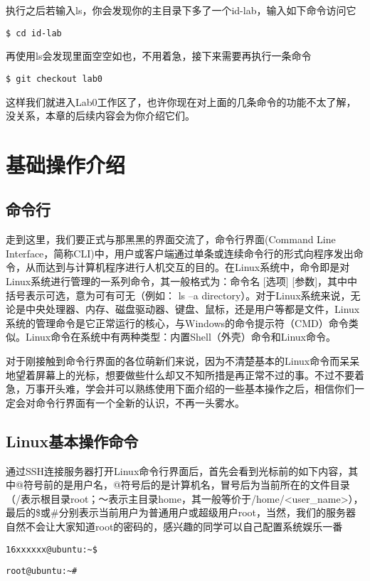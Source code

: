 执行之后若输入ls，你会发现你的主目录下多了一个id-lab，输入如下命令访问它
\begin{verbatim}
$ cd id-lab
\end{verbatim}
再使用ls会发现里面空空如也，不用着急，接下来需要再执行一条命令
\begin{verbatim}
$ git checkout lab0
\end{verbatim}
这样我们就进入Lab0工作区了，也许你现在对上面的几条命令的功能不太了解，没关系，本章的后续内容会为你介绍它们。

\section{基础操作介绍}
\subsection{命令行}
走到这里，我们要正式与那黑黑的界面交流了，命令行界面(Command Line Interface，简称CLI)中，用户或客户端通过单条或连续命令行的形式向程序发出命令，从而达到与计算机程序进行人机交互的目的。在Linux系统中，命令即是对Linux系统进行管理的一系列命令，其一般格式为：命令名 [选项] [参数]，其中中括号表示可选，意为可有可无（例如： ls –a directory）。对于Linux系统来说，无论是中央处理器、内存、磁盘驱动器、键盘、鼠标，还是用户等都是文件，Linux系统的管理命令是它正常运行的核心，与Windows的命令提示符（CMD）命令类似。Linux命令在系统中有两种类型：内置Shell（外壳）命令和Linux命令。

对于刚接触到命令行界面的各位萌新们来说，因为不清楚基本的Linux命令而呆呆地望着屏幕上的光标，想要做些什么却又不知所措是再正常不过的事。不过不要着急，万事开头难，学会并可以熟练使用下面介绍的一些基本操作之后，相信你们一定会对命令行界面有一个全新的认识，不再一头雾水。

\subsection{Linux基本操作命令}
通过SSH连接服务器打开Linux命令行界面后，首先会看到光标前的如下内容，其中@符号前的是用户名，@符号后的是计算机名，冒号后为当前所在的文件目录（/表示根目录root；～表示主目录home，其一般等价于/home/<user\_name>），最后的\$或\#分别表示当前用户为普通用户或超级用户root，当然，我们的服务器自然不会让大家知道root的密码的，感兴趣的同学可以自己配置系统娱乐一番

\begin{verbatim}
16xxxxxx@ubuntu:~$
\end{verbatim}
\begin{verbatim}
root@ubuntu:~#
\end{verbatim}

